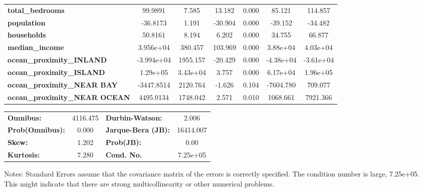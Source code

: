 \begin{center}
\begin{tabular}{lcccccc}
\textbf{total\_bedrooms}              &      99.9891  &        7.585     &    13.182  &         0.000        &       85.121    &      114.857     \\
\textbf{population}                   &     -36.8173  &        1.191     &   -30.904  &         0.000        &      -39.152    &      -34.482     \\
\textbf{households}                   &      50.8161  &        8.194     &     6.202  &         0.000        &       34.755    &       66.877     \\
\textbf{median\_income}               &    3.956e+04  &      380.457     &   103.969  &         0.000        &     3.88e+04    &     4.03e+04     \\
\textbf{ocean\_proximity\_INLAND}     &   -3.994e+04  &     1955.157     &   -20.429  &         0.000        &    -4.38e+04    &    -3.61e+04     \\
\textbf{ocean\_proximity\_ISLAND}     &     1.29e+05  &     3.43e+04     &     3.757  &         0.000        &     6.17e+04    &     1.96e+05     \\
\textbf{ocean\_proximity\_NEAR BAY}   &   -3447.8514  &     2120.764     &    -1.626  &         0.104        &    -7604.780    &      709.077     \\
\textbf{ocean\_proximity\_NEAR OCEAN} &    4495.0134  &     1748.042     &     2.571  &         0.010        &     1068.661    &     7921.366     \\
\bottomrule
\end{tabular}
\begin{tabular}{lclc}
\textbf{Omnibus:}       & 4116.475 & \textbf{  Durbin-Watson:     } &     2.006  \\
\textbf{Prob(Omnibus):} &   0.000  & \textbf{  Jarque-Bera (JB):  } & 16414.007  \\
\textbf{Skew:}          &   1.202  & \textbf{  Prob(JB):          } &      0.00  \\
\textbf{Kurtosis:}      &   7.280  & \textbf{  Cond. No.          } &  7.25e+05  \\
\bottomrule
\end{tabular}
\end{center}

Notes: \newline
 [1] Standard Errors assume that the covariance matrix of the errors is correctly specified. \newline
 [2] The condition number is large, 7.25e+05. This might indicate that there are \newline
 strong multicollinearity or other numerical problems.